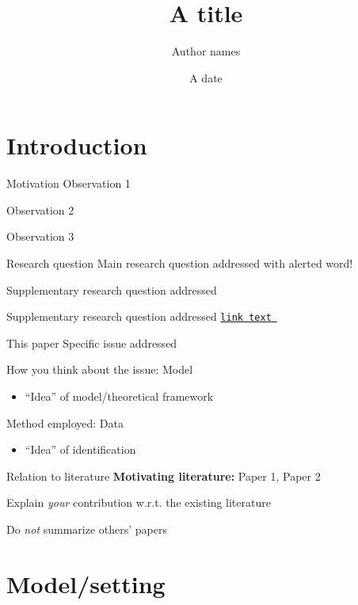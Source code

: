 \documentclass[aspectratio=169, 11pt]{beamer}
\title[Some title]{A title}
\author{Author names}
\date{A date}
\begin{document}
\maketitle

\section{Introduction}

\begin{frame}{Motivation}
    Observation 1
    
    Observation 2
    
    Observation 3
\end{frame}

\begin{frame}{Research question}
    Main research question addressed with \alert{alerted} word!\pause
    
    Supplementary research question addressed\pause
    
    Supplementary research question addressed \hyperlink{app_example}{\texttt{link text}~ }
\end{frame}

\begin{frame}{This paper}
    Specific issue addressed
    
    How you think about the issue: Model
    \begin{itemize}
        \item ``Idea'' of model/theoretical framework
    \end{itemize}
    
    Method employed: Data
    \begin{itemize}
        \item ``Idea'' of identification
    \end{itemize}
\end{frame}

\begin{frame}{Relation to literature}
    \textbf{Motivating literature:} Paper 1, Paper 2
    
    Explain \emph{your} contribution w.r.t. the existing literature
    
    Do \emph{not} summarize others' papers
\end{frame}

\section{Model/setting}
\end{document}
